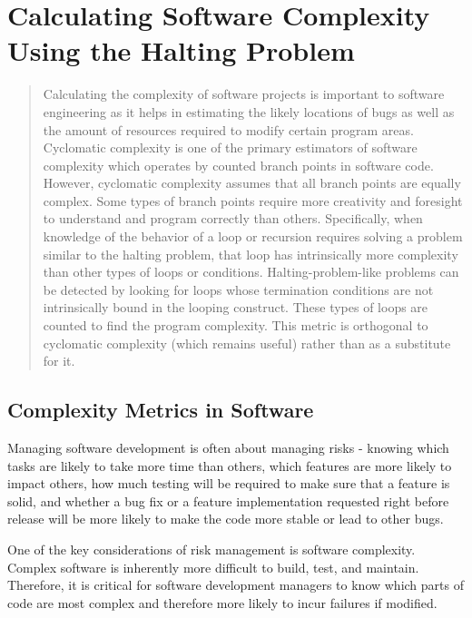 \chapter[Calculating Software Complexity]{Calculating Software Complexity Using the Halting Problem}

\begin{abstract}
Calculating the complexity of software projects is important to software engineering as it helps in estimating the likely locations of bugs as well as the amount of resources required to modify certain program areas.  Cyclomatic complexity is one of the primary estimators of software complexity which operates by counted branch points in software code.  However, cyclomatic complexity assumes that all branch points are equally complex.  Some types of branch points require more creativity and foresight to understand and program correctly than others.  Specifically, when knowledge of the behavior of a loop or recursion requires solving a problem similar to the halting problem, that loop has intrinsically more complexity than other types of loops or conditions.  Halting-problem-like problems can be detected by looking for loops whose termination conditions are not intrinsically bound in the looping construct.  These types of loops are counted to find the program complexity.  This metric is orthogonal to cyclomatic complexity (which remains useful) rather than as a substitute for it.
\end{abstract}

\section{Complexity Metrics in Software}

Managing software development is often about managing risks - knowing which tasks are likely to take more time than others, which features are more likely to impact others, how much testing will be required to make sure that a feature is solid, and whether a bug fix or a feature implementation requested right before release will be more likely to make the code more stable or lead to other bugs.

One of the key considerations of risk management is software complexity.  Complex software is inherently more difficult to build, test, and maintain.  Therefore, it is critical for software development managers to know which parts of code are most complex and therefore more likely to incur failures if modified.

